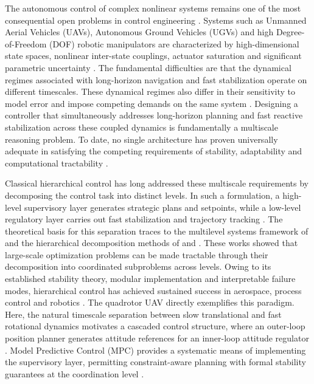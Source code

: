 \documentclass[12pt, a4paper]{article}
\begin{document}
The autonomous control of complex nonlinear systems remains one of the most consequential open problems in control engineering \parencite{iqbal_nonlinear_2017, liu_new_2015, daoutidis_future_2023}.
Systems such as Unmanned Aerial Vehicles (UAVs), Autonomous Ground Vehicles (UGVs) and high Degree-of-Freedom (DOF) robotic manipulators are characterized by high-dimensional state spaces, nonlinear inter-state couplings, actuator saturation and significant parametric uncertainty \parencite{sadati_two-level_2015, ameli_robust_2021, iqbal_nonlinear_2017, slotine_applied_1991}.
The fundamental difficulties are that the dynamical regimes associated with long-horizon navigation and fast stabilization operate on different timescales.
These dynamical regimes also differ in their sensitivity to model error and impose competing demands on the same system \parencite{liang_nonlinear_2018, abdelmaksoud_control_2020}.
Designing a controller that simultaneously addresses long-horizon planning and fast reactive stabilization across these coupled dynamics is fundamentally a multiscale reasoning problem.
To date, no single architecture has proven universally adequate in satisfying the competing requirements of stability, adaptability and computational tractability \parencite{rojas_complex_2025, goodwin_control_2001}.
 
Classical hierarchical control has long addressed these multiscale requirements by decomposing the control task into distinct levels.
In such a formulation, a high-level supervisory layer generates strategic plans and setpoints, while a low-level regulatory layer carries out fast stabilization and trajectory tracking \parencite{singh_systems_1978, sadati_two-level_2015, scattolini_hierarchical_2007, mesarovic_two_1970, wilson_foundations_1979}.
The theoretical basis for this separation traces to the multilevel systems framework of \textcite{mesarovic_two_1970} and the hierarchical decomposition methods of \textcite{singh_systems_1978} and \textcite{siljak_decentralized_2013}.
These works showed that large-scale optimization problems can be made tractable through their decomposition into coordinated subproblems across levels.
Owing to its established stability theory, modular implementation and interpretable failure modes, hierarchical control has achieved sustained success in aerospace, process control and robotics \parencite{sanders_hierarchical_1998, wang_hierarchical_2024, liu_generalized_2016, bahnasawi_decentralised_1990, roberts_optimal_2001}.
The quadrotor UAV directly exemplifies this paradigm.
Here, the natural timescale separation between slow translational and fast rotational dynamics motivates a cascaded control structure, where an outer-loop position planner generates attitude references for an inner-loop attitude regulator \parencite{hoffmann_quadrotor_2007, liang_nonlinear_2018, bouabdallah_pid_2004, nagaty_control_2013, abdelhay_modeling_2019}.
Model Predictive Control (MPC) provides a systematic means of implementing the supervisory layer, permitting constraint-aware planning with formal stability guarantees at the coordination level \parencite{scattolini_hierarchical_2007, wang_hierarchical_2024, torrente_data-driven_2021}.
 
\end{document}
